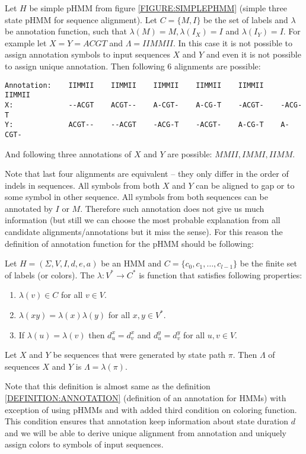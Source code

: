 Let $H$ be simple pHMM from figure \ref{FIGURE:SIMPLEPHMM} (simple three state
pHMM for sequence alignment). Let $C=\{M,I\}$ be the set of labels and 
$\lambda$ be annotation function, such that $\lambda(M)=M, \lambda(I_X)=I$ and
$\lambda(I_Y)=I$.   For example let $X=Y=ACGT$ and $\Lambda = IIMMII$.
In this case it is not possible to assign annotation symbols
to input sequences $X$ and $Y$ and even it is not possible to assign unique
annotation.
Then
following $6$ alignments are possible:
\begin{verbatim}
Annotation:    IIMMII    IIMMII    IIMMII    IIMMII    IIMMII    IIMMII
X:             --ACGT    ACGT--    A-CGT-    A-CG-T    -ACGT-    -ACG-T
Y:             ACGT--    --ACGT    -ACG-T    -ACGT-    A-CG-T    A-CGT-
\end{verbatim}
And following three annotations of $X$ and $Y$ are possible: $MMII,IMMI,IIMM$.

Note that last four  alignments are equivalent -- they only differ in the order
of indels in sequences. All symbols from both $X$ and $Y$ can be aligned to gap
or to some symbol in other sequence. All symbols from both sequences can be
annotated by $I$ or $M$. Therefore such annotation does not give us much
information (but still we can choose the most probable explanation from all
candidate alignments/annotations but it miss the sense).
For this reason the definition of annotation function for the pHMM
should be following:

\begin{definition}
Let $H=(\Sigma,V,I,d,e,a)$ be an HMM and $C=\{c_0,c_1,\dots,c_{l-1}\}$ be the
finite set of labels (or colors). The 
$\lambda:V^*\to C^*$ is function that satisfies following properties: 
\begin{enumerate}
\item $\lambda(v)\in C$ for all $v\in V$.
\item $\lambda(xy) = \lambda(x)\lambda(y)$ for all $x,y\in V^*$.
\item If $\lambda(u)=\lambda(v)$ then $d^x_u=d^x_v$ and $d^y_u=d^y_v$ for all
$u,v\in V$.
\end{enumerate}
Let $X$ and $Y$ be sequences that were generated by state path $\pi$. Then
 $\Lambda$ of sequences $X$ and $Y$ is 
$\Lambda=\lambda(\pi)$.
\end{definition}

Note that this definition is almost same as the definition
\ref{DEFINITION:ANNOTATION} (definition of an annotation for HMMs) with exception of using pHMMs and with added 
third condition on coloring function. This condition ensures that 
annotation keep information about state duration $d$ and we will
be able to derive unique alignment from annotation and uniquely assign
colors to symbols of input sequences.

